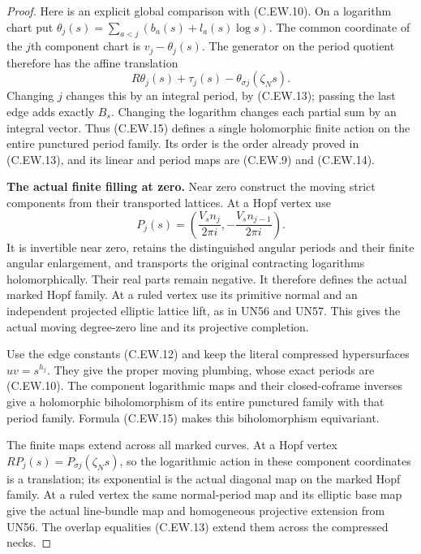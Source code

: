 \begin{proof}
Here is an explicit global comparison with (C.EW.10).
On a logarithm chart put
$\theta_j(s)=\sum_{a<j}(b_a(s)+l_a(s)\log s)$.
The common coordinate of the $j$th component chart is
$v_j-\theta_j(s)$. The generator on the period quotient
therefore has the affine translation
\[
 R\theta_j(s)+\tau_j(s)-\theta_{\sigma j}(\zeta_Ns).
\tag{C.EW.15}
\]
Changing $j$ changes this by an integral period, by
(C.EW.13); passing the last edge adds exactly $B_s$.
Changing the logarithm changes each partial sum by
an integral vector. Thus (C.EW.15) defines a single
holomorphic finite action on the entire punctured
period family. Its order is the order already proved
in (C.EW.13), and its linear and period maps are
(C.EW.9) and (C.EW.14).

\par\medskip\noindent\textbf{The actual finite filling at zero.}
Near zero construct the moving strict components from
their transported lattices. At a Hopf vertex use
\[
 P_j(s)=\left(\frac{V_s n_j}{2\pi i},
                        -\frac{V_s n_{j-1}}{2\pi i}\right).
\tag{C.EW.16}
\]
It is invertible near zero, retains the distinguished
angular periods and their finite angular enlargement,
and transports the original contracting logarithms
holomorphically. Their real parts remain negative.
It therefore defines the actual marked Hopf family.
At a ruled vertex use its primitive normal and an
independent projected elliptic lattice lift, as in
UN56 and UN57. This gives the actual moving
degree-zero line and its projective completion.

Use the edge constants (C.EW.12) and keep the literal
compressed hypersurfaces $uv=s^{h_j}$. They give the
proper moving plumbing, whose exact periods are
(C.EW.10). The component logarithmic maps and their
closed-coframe inverses give a holomorphic
biholomorphism of its entire punctured family with
that period family. Formula (C.EW.15) makes this
biholomorphism equivariant.

The finite maps extend across all marked curves.
At a Hopf vertex
$RP_j(s)=P_{\sigma j}(\zeta_Ns)$, so the logarithmic
action in these component coordinates is a translation;
its exponential is the actual diagonal map on the
marked Hopf family. At a ruled vertex the same
normal-period map and its elliptic base map give the
actual line-bundle map and homogeneous projective
extension from UN56. The overlap equalities
(C.EW.13) extend them across the compressed necks.


\end{proof}
